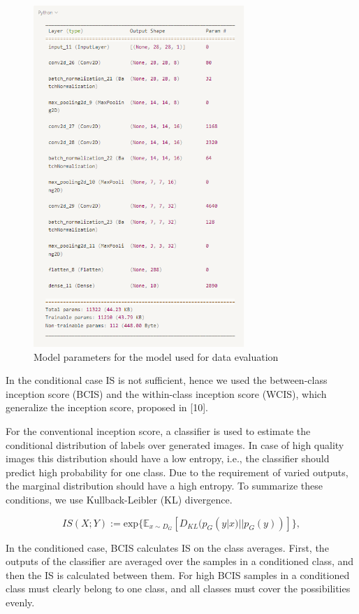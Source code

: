 \documentclass[lettersize,journal]{IEEEtran}
\begin{document}
\begin{figure}[h]
    \centering
    \includegraphics[width=8cm]{model}
    \caption{Model parameters for the model used for data evaluation}
    \label{fig_3}
\end{figure}
\newpage

In the conditional case IS is not sufficient, hence we used the between-class inception score (BCIS) and the within-class inception score (WCIS), which generalize the inception score, proposed in [10].

\vspace*{1em}For the conventional inception score, a classifier is used to estimate the conditional distribution of labels over generated images. In case of high quality images this distribution should have a low entropy, i.e., the classifier should predict high probability for one class. Due to the requirement of varied outputs, the marginal distribution should have a high entropy. To summarize these conditions, we use Kullback-Leibler (KL) divergence.

\begin{equation}
    IS(X;Y) := \text{exp} \{ \mathbb{E}_{x \sim D_G}[D_{KL}(p_G(y|x)||p_G(y))]\},
\end{equation}

In the conditioned case, BCIS calculates IS on the class averages. First, the outputs of the classifier are averaged over the samples in a conditioned class, and then the IS is calculated between them. For high BCIS samples in a conditioned class must clearly belong to one class, and all classes must cover the possibilities evenly.
\end{document}

